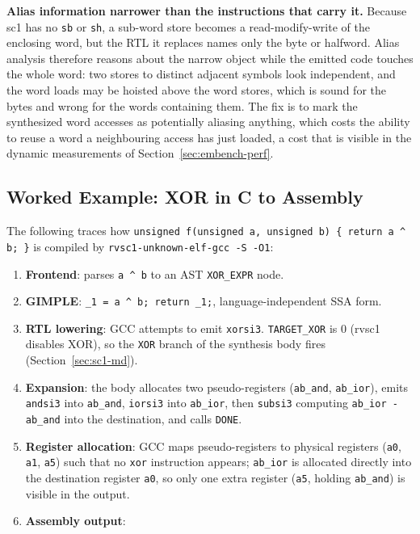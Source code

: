 \textbf{Alias information narrower than the instructions that carry it.} Because sc1 has no
\texttt{sb} or \texttt{sh}, a sub-word store becomes a read-modify-write of the enclosing word, but
the RTL it replaces names only the byte or halfword. Alias analysis therefore reasons about the narrow
object while the emitted code touches the whole word: two stores to distinct adjacent symbols look
independent, and the word loads may be hoisted above the word stores, which is sound for the bytes and
wrong for the words containing them. The fix is to mark the synthesized word accesses as potentially
aliasing anything, which costs the ability to reuse a word a neighbouring access has just loaded, a
cost that is visible in the dynamic measurements of Section~\ref{sec:embench-perf}.

\subsection{Worked Example: XOR in C to Assembly} \label{sec:sc1-example}

The following traces how \texttt{unsigned f(unsigned a, unsigned b) \{ return a \^{} b; \}} is
compiled by \texttt{rvsc1-unknown-elf-gcc -S -O1}:

\begin{enumerate}
  \item \textbf{Frontend}: parses \texttt{a \^{} b} to an AST \texttt{XOR\_EXPR} node.
  \item \textbf{GIMPLE}: \texttt{\_1 = a \^{} b; return \_1;}, language-independent SSA form.
  \item \textbf{RTL lowering}: GCC attempts to emit \texttt{xorsi3}. \texttt{TARGET\_XOR} is 0
        (rvsc1 disables XOR), so the \texttt{XOR} branch of the synthesis body fires
        (Section~\ref{sec:sc1-md}).
  \item \textbf{Expansion}: the body allocates two pseudo-registers (\texttt{ab\_and},
        \texttt{ab\_ior}), emits \texttt{andsi3} into \texttt{ab\_and}, \texttt{iorsi3} into
        \texttt{ab\_ior}, then \texttt{subsi3} computing \texttt{ab\_ior - ab\_and} into the
        destination, and calls \texttt{DONE}.
  \item \textbf{Register allocation}: GCC maps pseudo-registers to physical registers (\texttt{a0},
        \texttt{a1}, \texttt{a5}) such that no \texttt{xor} instruction appears; \texttt{ab\_ior} is
        allocated directly into the destination register \texttt{a0}, so only one extra register
        (\texttt{a5}, holding \texttt{ab\_and}) is visible in the output.
  \item \textbf{Assembly output}:
\end{enumerate}

